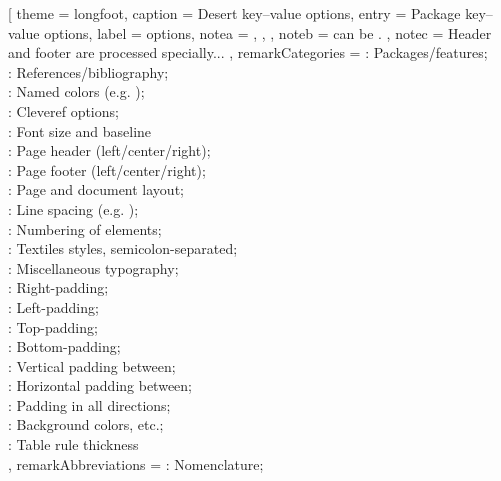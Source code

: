 \begin{BigPages} [hmargin=0.5cm, vmargin=1cm]
\begin{LongTable} [
    theme                  = longfoot,
    caption                = {Desert key--value options},
    entry                  = {Package key--value options},
    label                  = {options},
    note{a}                = {
         \sep
         \sep
    } ,
    note{b}                = {
         can be .
    } ,
    note{c}                = {
        Header and footer are processed specially...
    } ,
    remark{Categories}     = {
        : Packages/features;\\
        : References/bibliography;\\
        : Named colors (e.g. );\\
        : Cleveref options;\\
        : Font size and baseline\\
        : Page header (left/center/right);\\
        : Page footer (left/center/right);\\
        : Page and document layout;\\
        : Line spacing (e.g. );\\
        : Numbering of elements;\\
        : Textiles styles, semicolon-separated;\\
        : Miscellaneous typography;\\
        : Right-padding;\\
        : Left-padding;\\
        : Top-padding;\\
        : Bottom-padding;\\
        : Vertical padding between;\\
        : Horizontal padding between;\\
        : Padding in all directions;\\
        : Background colors, etc.;\\
        : Table rule thickness\\
    } ,
    remark{Abbreviations}  = {
        : Nomenclature;  \\
}
\end{LongTable}
\end{BigPages}
